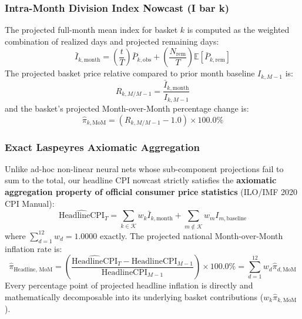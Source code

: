 \documentclass[11pt,a4paper,oneside]{article}
\begin{document}
\subsubsection{Intra-Month Division Index Nowcast (I bar k)}
The projected full-month mean index for basket $k$ is computed as the weighted combination of realized days and projected remaining days:
\begin{equation}
\bar{I}_{k, \text{month}} = \left( \frac{t}{T} \right) \bar{P}_{k, \text{obs}} + \left( \frac{N_{\text{rem}}}{T} \right) \mathbb{E}[\bar{P}_{k, \text{rem}}]
\end{equation}
The projected basket price relative compared to prior month baseline $I_{k, M-1}$ is:
\begin{equation}
R_{k, M/M-1} = \frac{\bar{I}_{k, \text{month}}}{I_{k, M-1}}
\end{equation}
and the basket's projected Month-over-Month percentage change is:
\begin{equation}
\hat{\pi}_{k, \text{MoM}} = (R_{k, M/M-1} - 1.0) \times 100.0\%
\end{equation}

\subsubsection{Exact Laspeyres Axiomatic Aggregation}
Unlike ad-hoc non-linear neural nets whose sub-component projections fail to sum to the total, our headline CPI nowcast strictly satisfies the \textbf{axiomatic aggregation property of official consumer price statistics} (ILO/IMF 2020 CPI Manual):
\begin{equation}
\widehat{\text{HeadlineCPI}}_T = \sum_{k \in \mathcal{K}} w_k \bar{I}_{k, \text{month}} + \sum_{m \notin \mathcal{K}} w_m I_{m, \text{baseline}}
\end{equation}
where $\sum_{d=1}^{12} w_d = 1.0000$ exactly. The projected national Month-over-Month inflation rate is:
\begin{equation}
\hat{\pi}_{\text{Headline, MoM}} = \left( \frac{\widehat{\text{HeadlineCPI}}_T - \text{HeadlineCPI}_{M-1}}{\text{HeadlineCPI}_{M-1}} \right) \times 100.0\% = \sum_{d=1}^{12} w_d \hat{\pi}_{d, \text{MoM}}
\end{equation}
Every percentage point of projected headline inflation is directly and mathematically decomposable into its underlying basket contributions ($w_k \hat{\pi}_{k, \text{MoM}}$).
\end{document}
